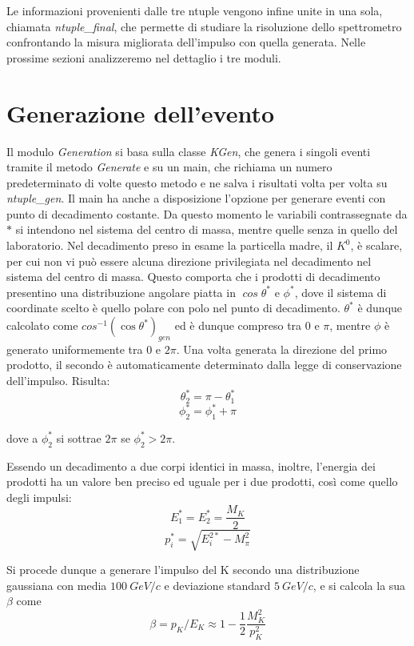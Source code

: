\documentclass[8pt]{extarticle}
\begin{document}
Le informazioni provenienti dalle tre ntuple vengono infine unite in una sola, chiamata \textit{ntuple\_final}, che permette di studiare la risoluzione dello spettrometro confrontando la misura migliorata dell'impulso con quella generata. Nelle prossime sezioni analizzeremo nel dettaglio i tre moduli. \\

\section{Generazione dell'evento} \label{sec:generation}

Il modulo \textit{Generation} si basa sulla classe \textit{KGen}, che genera i singoli eventi tramite il metodo \textit{Generate} e su un main, che richiama un numero predeterminato di volte questo metodo e ne salva i risultati volta per volta su \textit{ntuple\_gen}. Il main ha anche a disposizione l'opzione per generare eventi con punto di decadimento costante. \medskip
Da questo momento le variabili contrassegnate da $*$ si intendono nel sistema del centro di massa, mentre quelle senza in quello del laboratorio.
Nel decadimento preso in esame la particella madre, il $K^0$, è scalare, per cui non vi può essere alcuna direzione privilegiata nel decadimento nel sistema del centro di massa. Questo comporta che i prodotti di decadimento presentino una distribuzione angolare piatta in $\mathit{\cos{\theta^*}}$ e $\mathit{\phi^*}$, dove il sistema di coordinate scelto è quello polare con polo nel punto di decadimento. $\theta^*$ è dunque calcolato come $cos^{-1}(\cos{\theta^*})_{gen}$ ed è dunque compreso tra $0$ e $\pi$, mentre $\phi$ è generato uniformemente tra $0$ e $2\pi$. Una volta generata la direzione del primo prodotto, il secondo è automaticamente determinato dalla legge di conservazione dell'impulso. Risulta: \\
$$
\theta_2^* = \pi - \theta_1^*
$$
$$
\phi_2^* = \phi_1^* + \pi
$$

dove a $\phi_2^*$ si sottrae $2\pi$ se $\phi_2^* > 2\pi$. 


Essendo un decadimento a due corpi identici in massa, inoltre, l'energia dei prodotti ha un valore ben preciso ed uguale per i due prodotti, così come quello degli impulsi: 
$$
E_1^* = E_2^* = \frac{M_K}{2}
$$
$$
p_i^* = \sqrt{E_i^{2*} - M_\pi^2}
$$

Si procede dunque a generare l'impulso del K secondo una distribuzione gaussiana con media $100\ GeV/c$ e deviazione standard $5\ GeV/c$, e si calcola la sua $\beta$ come
$$
\beta = p_K/E_K \approx 1 - \frac{1}{2} \frac{M_K^2}{p_K^2}
$$
\end{document}
